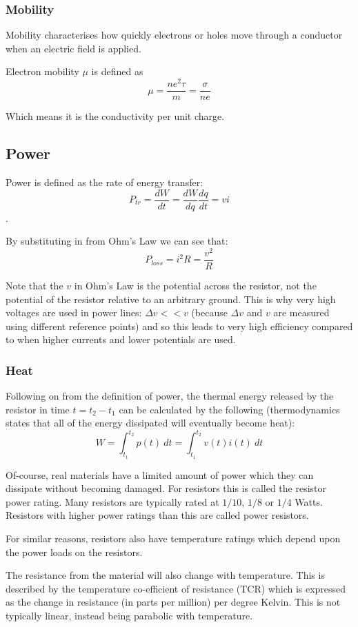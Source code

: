 \documentclass[11pt,a4paper]{report}
\begin{document}
\subsubsection{Mobility}
Mobility characterises how quickly electrons or holes move through a conductor when an electric field is applied. 

Electron mobility $\mu$ is defined as
\[\mu = \frac{ne^2\tau}{m} = \frac{\sigma}{ne}\]

Which means it is the conductivity per unit charge.

\subsection{Power}
Power is defined as the rate of energy transfer:
\[P_{tr} = \frac{dW}{dt} = \frac{dW}{dq}\frac{dq}{dt} = vi\].

By substituting in from Ohm's Law we can see that:
\[P_{loss} = i^2R = \frac{v^2}{R}\]

Note that the $v$ in Ohm's Law is the potential across the resistor, not the potential of the resistor relative to an arbitrary ground. This is why very high voltages are used in power lines: $\Delta v << v$ (because $\Delta v$ and $v$ are measured using different reference points) and so this leads to very high efficiency compared to when higher currents and lower potentials are used.

\subsubsection{Heat}
Following on from the definition of power, the thermal energy released by the resistor in time $t = t_2 - t_1$ can be calculated by the following (thermodynamics states that all of the energy dissipated will eventually become heat):
\[W=\int_{t_1}^{t_2} p(t) \: dt = \int_{t_1}^{t_2} v(t)i(t) \: dt\]

Of-course, real materials have a limited amount of power which they can dissipate without becoming damaged. For resistors this is called the resistor power rating. Many resistors are typically rated at $1/10$, $1/8$ or $1/4$ Watts. Resistors with higher power ratings than this are called power resistors.

For similar reasons, resistors also have temperature ratings which depend upon the power loads on the resistors.

The resistance from the material will also change with temperature. This is described by the temperature co-efficient of resistance (TCR) which is expressed as the change in resistance (in parts per million) per degree Kelvin. This is not typically linear, instead being parabolic with temperature.
\end{document}
